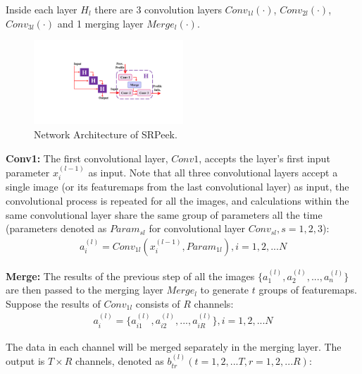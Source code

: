 Inside each layer $H_l$ there are 3 convolution layers $Conv_{1l}(\cdot)$, $Conv_{2l}(\cdot)$, $Conv_{3l}(\cdot)$ and 1 merging layer $Merge_l(\cdot)$.

\begin{figure}
    \centering
       \includegraphics[width=0.5\textwidth]{./pic/network.pdf}
       \caption{Network Architecture of SRPeek.}
       \label{fig-system}
   \end{figure}   

\vspace{1mm}
\noindent
\textbf{Conv1:} The first convolutional layer, $Conv1$, accepts the layer's first input parameter $x_i^{(l-1)}$ as input. Note that all three convolutional layers accept a single image (or its featuremaps from the last convolutional layer) as input, the convolutional process is repeated for all the images, and calculations within the same convolutional layer share the same group of parameters all the time (parameters denoted as $Param_{sl}$ for convolutional layer $Conv_{sl}, s=1,2,3$):
\begin{equation}\label{eq:4}
    \begin{split}
        a_i^{(l)} = Conv_{1l}(x_i^{(l-1)},Param_{1l}), i=1,2,...N
\end{split}
\end{equation}

\vspace{1mm}
\noindent
\textbf{Merge:} The results of the previous step of all the images $\{a_1^{(l)},a_2^{(l)},...,a_n^{(l)}\}$ are then passed to the merging layer $Merge_l$ to generate $t$ groups of featuremaps. Suppose the results of $Conv_{1l}$ consists of $R$ channels:
\begin{equation}\label{eq:5}
    \begin{split}
        a_i^{(l)} = \{a_{i1}^{(l)},a_{i2}^{(l)},...,a_{iR}^{(l)}\}, i=1,2,...N
\end{split}
\end{equation}

The data in each channel will be merged separately in the merging layer. The output is $T\times R$ channels, denoted as $b_{tr}^{(l)}(t=1,2,...T, r=1,2,...R)$:

